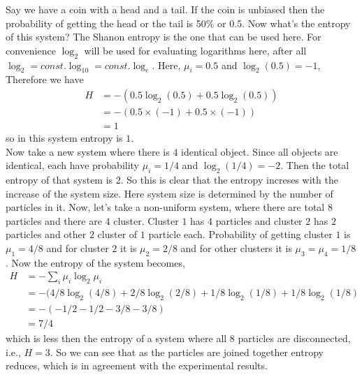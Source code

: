 	
	Say we have a coin with a head and a tail. If the coin is unbiased then the probability of getting the head or the tail is 50\% or 0.5. Now what's the entropy of this system? The Shanon entropy is the one that can be used here. For convenience $\log_{2}$ will be used for evaluating logarithms here, after all $\log_{2} = const. \log_{10} = const. \log_{e}$. Here, $\mu_i = 0.5$ and $\log_{2} (0.5) = -1$, Therefore we have
	\begin{align}
		H &= - (0.5 \log_{2} (0.5) + 0.5 \log_{2} (0.5)) \nonumber \\ 
		&= - (0.5 \times (-1) + 0.5 \times (-1)) \nonumber \\ 
		&= 1 \nonumber
	\end{align}
	so in this system entropy is $1$.\\
	Now take a new system where there is $4$ identical object. Since all objects are identical, each have probability $\mu_i = 1/4$ and $\log_{2} (1/4) = -2$. Then the total entropy of that system is $2$. So this is clear that the entropy increses with the increase of the system size. Here system size is determined by the number of particles in it. Now, let's take a non-uniform system, where there are total $8$ particles and there are $4$ cluster. Cluster $1$ has $4$ particles and cluster $2$ has $2$ particles and other $2$ cluster of $1$ particle each. Probability of getting cluster $1$ is $\mu_1 = 4/8$ and for cluster $2$ it is $\mu_2 = 2/8$ and for other clusters it is $\mu_3 = \mu_4 = 1/8$. Now the entropy of the system becomes,
	\begin{align}
		H &= - \sum_i \mu_i \log_2 \mu_i \nonumber \\
		&= - (4/8 \log_2 (4/8) + 2/8 \log_2 (2/8) + 1/8 \log_2(1/8) + 1/8 \log_2(1/8) \nonumber \\
		&= - (-1/2 -1/2 -3/8 -3/8) \nonumber \\
		&= 7/4 \nonumber
	\end{align}
	which is less then the entropy of a system where all $8$ particles are disconnected, i.e., $H=3$. So we can see that as the particles are joined together entropy reduces, which is in agreement with the experimental results. 
